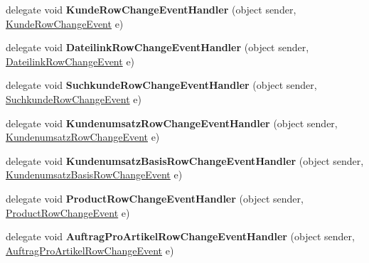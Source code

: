 \begin{DoxyCompactItemize}
\item 
delegate void {\bfseries Kunde\+Row\+Change\+Event\+Handler} (object sender, \hyperlink{class_products_1_1_data_1_1ds_sage_1_1_kunde_row_change_event}{Kunde\+Row\+Change\+Event} e)\hypertarget{class_products_1_1_data_1_1ds_sage_afef2dd5e29f032979915c670ed026fea}{}\label{class_products_1_1_data_1_1ds_sage_afef2dd5e29f032979915c670ed026fea}

\item 
delegate void {\bfseries Dateilink\+Row\+Change\+Event\+Handler} (object sender, \hyperlink{class_products_1_1_data_1_1ds_sage_1_1_dateilink_row_change_event}{Dateilink\+Row\+Change\+Event} e)\hypertarget{class_products_1_1_data_1_1ds_sage_a7d601be227a68768ca8cc6c7de1aff70}{}\label{class_products_1_1_data_1_1ds_sage_a7d601be227a68768ca8cc6c7de1aff70}

\item 
delegate void {\bfseries Suchkunde\+Row\+Change\+Event\+Handler} (object sender, \hyperlink{class_products_1_1_data_1_1ds_sage_1_1_suchkunde_row_change_event}{Suchkunde\+Row\+Change\+Event} e)\hypertarget{class_products_1_1_data_1_1ds_sage_a3de84a78f8b77f740120f11f13ce2697}{}\label{class_products_1_1_data_1_1ds_sage_a3de84a78f8b77f740120f11f13ce2697}

\item 
delegate void {\bfseries Kundenumsatz\+Row\+Change\+Event\+Handler} (object sender, \hyperlink{class_products_1_1_data_1_1ds_sage_1_1_kundenumsatz_row_change_event}{Kundenumsatz\+Row\+Change\+Event} e)\hypertarget{class_products_1_1_data_1_1ds_sage_ab620ac0913adc56f8fae518adefa2b9f}{}\label{class_products_1_1_data_1_1ds_sage_ab620ac0913adc56f8fae518adefa2b9f}

\item 
delegate void {\bfseries Kundenumsatz\+Basis\+Row\+Change\+Event\+Handler} (object sender, \hyperlink{class_products_1_1_data_1_1ds_sage_1_1_kundenumsatz_basis_row_change_event}{Kundenumsatz\+Basis\+Row\+Change\+Event} e)\hypertarget{class_products_1_1_data_1_1ds_sage_a9e1d25eb4e246daff38ddef902fbc138}{}\label{class_products_1_1_data_1_1ds_sage_a9e1d25eb4e246daff38ddef902fbc138}

\item 
delegate void {\bfseries Product\+Row\+Change\+Event\+Handler} (object sender, \hyperlink{class_products_1_1_data_1_1ds_sage_1_1_product_row_change_event}{Product\+Row\+Change\+Event} e)\hypertarget{class_products_1_1_data_1_1ds_sage_a16c256b1d00dd594e836364a2b0a6155}{}\label{class_products_1_1_data_1_1ds_sage_a16c256b1d00dd594e836364a2b0a6155}

\item 
delegate void {\bfseries Auftrag\+Pro\+Artikel\+Row\+Change\+Event\+Handler} (object sender, \hyperlink{class_products_1_1_data_1_1ds_sage_1_1_auftrag_pro_artikel_row_change_event}{Auftrag\+Pro\+Artikel\+Row\+Change\+Event} e)\hypertarget{class_products_1_1_data_1_1ds_sage_a04f456776d4f1a49336b160c1a6c4252}{}\label{class_products_1_1_data_1_1ds_sage_a04f456776d4f1a49336b160c1a6c4252}

\end{DoxyCompactItemize}
